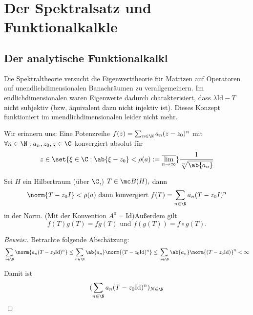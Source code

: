 \chapter{Der Spektralsatz und Funktionalkalk\us le}
\section{Der analytische Funktionalkalk\us l}
\begin{rem}
	
	Die Spektraltheorie versucht die Eigenwerttheorie für Matrizen auf Operatoren auf unendlichdimensionalen Banachräumen zu verallgemeinern. Im endlichdimensionalen waren Eigenwerte dadurch charakterisiert, dass $\lambda \text{Id} - T$ nicht subjektiv (bzw, äquivalent dazu nicht injektiv ist). Dieses Konzept funktioniert im unendlichdimensionalen leider nicht mehr.
	
\end{rem}


\begin{rem}
	
	Wir erinnern uns: Eine Potenzreihe $f(z) = \sum_{n \in \N} a_n(z-z_0)^n$ mit $\forall n \in \N: a_n, z_0, z \in \C$ konvergiert absolut für \[z \in \set{\xi \in \C: \ab{\xi-z_0}< \rho(a) := \overline{\lim_{n \to \infty}}} \frac{1}{\sqrt[n]{\ab{a_n}}} \]
	
\end{rem}


\begin{theorem} Sei $H$ ein Hilbertraum (über $\C$,) $T \in \mc B(H),$ dann \[\norm{T-z_0I}< \rho(a) \text{ dann konvergiert } f(T) = \sum_{n \in \N} a_n(T-z_0I)^n\] in der Norm. (Mit der Konvention $A^0 = \text{Id}$)Außerdem gilt \[f(T)g(T) = fg(T) \text{ und } f(g(T)) = f \circ g(T).\]
	
	\begin{proof}[Beweis:] Betrachte folgende Abschätzung: \[\sum_{n \in \N} \norm{a_n(T-z_0\text{Id})^n} \leq \sum_{n \in \N} \ab{a_n}\norm{(T-z_0\text{Id})^n} \leq \sum_{n \in \N} \ab{a_n}\norm{(T-z_0\text{Id})}^n < \infty\]
		
		Damit ist \[(\sum_{n \in \N} a_n(T-z_0 \text{Id})^n)_{N \in \N}\]
		
		
		
	\end{proof}
	
\end{theorem}


